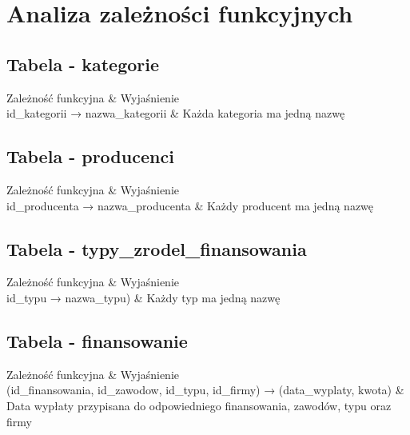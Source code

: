 \documentclass{article}
\begin{document}
\section{Analiza zależności funkcyjnych}
\subsection{Tabela - kategorie}

\begin{tcolorbox}[tab2,tabularx={X||X|X}]
Zależność funkcyjna & Wyjaśnienie     \\
\hline
\hline
id\_kategorii → nazwa\_kategorii & Każda kategoria ma jedną nazwę \\    
\end{tcolorbox}

\subsection{Tabela - producenci}

\begin{tcolorbox}[tab2,tabularx={X||X}]
Zależność funkcyjna & Wyjaśnienie     \\
\hline
\hline
id\_producenta → nazwa\_producenta & Każdy producent ma jedną nazwę \\     
\end{tcolorbox}

\subsection{Tabela - typy\_zrodel\_finansowania}

\begin{tcolorbox}[tab2,tabularx={X||X}]
Zależność funkcyjna & Wyjaśnienie     \\
\hline
\hline
id\_typu → nazwa\_typu) & Każdy typ ma jedną nazwę \\    
\end{tcolorbox}

\subsection{Tabela - finansowanie}

\begin{tcolorbox}[tab2,tabularx={X||X}]
Zależność funkcyjna & Wyjaśnienie     \\
\hline
\hline
(id\_finansowania, id\_zawodow, id\_typu, id\_firmy) → (data\_wyplaty, kwota) & Data wypłaty przypisana do odpowiedniego finansowania, zawodów, typu oraz firmy \\    
\end{tcolorbox}
\end{document}
